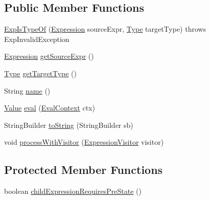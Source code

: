 \subsection*{Public Member Functions}
\begin{DoxyCompactItemize}
\item 
\hyperlink{classorg_1_1tzi_1_1use_1_1uml_1_1ocl_1_1expr_1_1_exp_is_type_of_adaa3cb7e19c097a90590714eedf99ec6}{Exp\-Is\-Type\-Of} (\hyperlink{classorg_1_1tzi_1_1use_1_1uml_1_1ocl_1_1expr_1_1_expression}{Expression} source\-Expr, \hyperlink{interfaceorg_1_1tzi_1_1use_1_1uml_1_1ocl_1_1type_1_1_type}{Type} target\-Type)  throws Exp\-Invalid\-Exception     
\item 
\hyperlink{classorg_1_1tzi_1_1use_1_1uml_1_1ocl_1_1expr_1_1_expression}{Expression} \hyperlink{classorg_1_1tzi_1_1use_1_1uml_1_1ocl_1_1expr_1_1_exp_is_type_of_a67df70f5b89f9aed4cc7fdd9f8a402d3}{get\-Source\-Expr} ()
\item 
\hyperlink{interfaceorg_1_1tzi_1_1use_1_1uml_1_1ocl_1_1type_1_1_type}{Type} \hyperlink{classorg_1_1tzi_1_1use_1_1uml_1_1ocl_1_1expr_1_1_exp_is_type_of_a8c264d9cc259c0db0191658e162ba610}{get\-Target\-Type} ()
\item 
String \hyperlink{classorg_1_1tzi_1_1use_1_1uml_1_1ocl_1_1expr_1_1_exp_is_type_of_ae22fda3bc70894793930adae325694ca}{name} ()
\item 
\hyperlink{classorg_1_1tzi_1_1use_1_1uml_1_1ocl_1_1value_1_1_value}{Value} \hyperlink{classorg_1_1tzi_1_1use_1_1uml_1_1ocl_1_1expr_1_1_exp_is_type_of_aadce900d619a9e3f671f080ae21acbec}{eval} (\hyperlink{classorg_1_1tzi_1_1use_1_1uml_1_1ocl_1_1expr_1_1_eval_context}{Eval\-Context} ctx)
\item 
String\-Builder \hyperlink{classorg_1_1tzi_1_1use_1_1uml_1_1ocl_1_1expr_1_1_exp_is_type_of_a78190c01733b77553177ac0197b3b9e0}{to\-String} (String\-Builder sb)
\item 
void \hyperlink{classorg_1_1tzi_1_1use_1_1uml_1_1ocl_1_1expr_1_1_exp_is_type_of_aeec9237f03bad5a0e97c1fadcf824f99}{process\-With\-Visitor} (\hyperlink{interfaceorg_1_1tzi_1_1use_1_1uml_1_1ocl_1_1expr_1_1_expression_visitor}{Expression\-Visitor} visitor)
\end{DoxyCompactItemize}
\subsection*{Protected Member Functions}
\begin{DoxyCompactItemize}
\item 
boolean \hyperlink{classorg_1_1tzi_1_1use_1_1uml_1_1ocl_1_1expr_1_1_exp_is_type_of_a61191bae6880949cc9dd0286347aa721}{child\-Expression\-Requires\-Pre\-State} ()
\end{DoxyCompactItemize}


